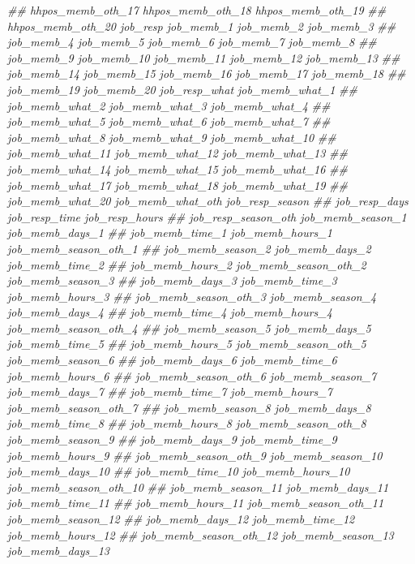 \documentclass[
]{article}
\newenvironment{Shaded}{\begin{snugshade}}{\end{snugshade}}
\newcommand{\CommentTok}[1]{\textcolor[rgb]{0.56,0.35,0.01}{\textit{#1}}}
\begin{document}
\begin{Shaded}
\begin{Highlighting}[]
\CommentTok{##      hhpos_memb_oth_17 hhpos_memb_oth_18 hhpos_memb_oth_19}
\CommentTok{##      hhpos_memb_oth_20 job_resp job_memb_1 job_memb_2 job_memb_3}
\CommentTok{##      job_memb_4 job_memb_5 job_memb_6 job_memb_7 job_memb_8}
\CommentTok{##      job_memb_9 job_memb_10 job_memb_11 job_memb_12 job_memb_13}
\CommentTok{##      job_memb_14 job_memb_15 job_memb_16 job_memb_17 job_memb_18}
\CommentTok{##      job_memb_19 job_memb_20 job_resp_what job_memb_what_1}
\CommentTok{##      job_memb_what_2 job_memb_what_3 job_memb_what_4}
\CommentTok{##      job_memb_what_5 job_memb_what_6 job_memb_what_7}
\CommentTok{##      job_memb_what_8 job_memb_what_9 job_memb_what_10}
\CommentTok{##      job_memb_what_11 job_memb_what_12 job_memb_what_13}
\CommentTok{##      job_memb_what_14 job_memb_what_15 job_memb_what_16}
\CommentTok{##      job_memb_what_17 job_memb_what_18 job_memb_what_19}
\CommentTok{##      job_memb_what_20 job_memb_what_oth job_resp_season}
\CommentTok{##      job_resp_days job_resp_time job_resp_hours}
\CommentTok{##      job_resp_season_oth job_memb_season_1 job_memb_days_1}
\CommentTok{##      job_memb_time_1 job_memb_hours_1 job_memb_season_oth_1}
\CommentTok{##      job_memb_season_2 job_memb_days_2 job_memb_time_2}
\CommentTok{##      job_memb_hours_2 job_memb_season_oth_2 job_memb_season_3}
\CommentTok{##      job_memb_days_3 job_memb_time_3 job_memb_hours_3}
\CommentTok{##      job_memb_season_oth_3 job_memb_season_4 job_memb_days_4}
\CommentTok{##      job_memb_time_4 job_memb_hours_4 job_memb_season_oth_4}
\CommentTok{##      job_memb_season_5 job_memb_days_5 job_memb_time_5}
\CommentTok{##      job_memb_hours_5 job_memb_season_oth_5 job_memb_season_6}
\CommentTok{##      job_memb_days_6 job_memb_time_6 job_memb_hours_6}
\CommentTok{##      job_memb_season_oth_6 job_memb_season_7 job_memb_days_7}
\CommentTok{##      job_memb_time_7 job_memb_hours_7 job_memb_season_oth_7}
\CommentTok{##      job_memb_season_8 job_memb_days_8 job_memb_time_8}
\CommentTok{##      job_memb_hours_8 job_memb_season_oth_8 job_memb_season_9}
\CommentTok{##      job_memb_days_9 job_memb_time_9 job_memb_hours_9}
\CommentTok{##      job_memb_season_oth_9 job_memb_season_10 job_memb_days_10}
\CommentTok{##      job_memb_time_10 job_memb_hours_10 job_memb_season_oth_10}
\CommentTok{##      job_memb_season_11 job_memb_days_11 job_memb_time_11}
\CommentTok{##      job_memb_hours_11 job_memb_season_oth_11 job_memb_season_12}
\CommentTok{##      job_memb_days_12 job_memb_time_12 job_memb_hours_12}
\CommentTok{##      job_memb_season_oth_12 job_memb_season_13 job_memb_days_13}

\end{Highlighting}
\end{Shaded}
\end{document}
